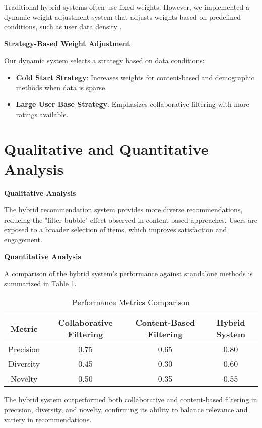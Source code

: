 \documentclass{article}
\begin{document}
Traditional hybrid systems often use fixed weights. However, we implemented a dynamic weight adjustment system that adjusts weights based on predefined conditions, such as user data density \cite{Tian2019}. 

\textbf{Strategy-Based Weight Adjustment}

Our dynamic system selects a strategy based on data conditions:
\begin{itemize}
    \item \textbf{Cold Start Strategy}: Increases weights for content-based and demographic methods when data is sparse.
    \item \textbf{Large User Base Strategy}: Emphasizes collaborative filtering with more ratings available.
\end{itemize}

\section{Qualitative and Quantitative Analysis}

\textbf{Qualitative Analysis}

The hybrid recommendation system provides more diverse recommendations, reducing the "filter bubble" effect observed in content-based approaches. Users are exposed to a broader selection of items, which improves satisfaction and engagement.

\textbf{Quantitative Analysis}

A comparison of the hybrid system's performance against standalone methods is summarized in Table \ref{table:metrics}.

\begin{table}[h]
    \centering
    \begin{tabular}{|c|c|c|c|}
        \hline
        Metric & Collaborative Filtering & Content-Based Filtering & Hybrid System \\
        \hline
        Precision & 0.75 & 0.65 & 0.80 \\
        Diversity & 0.45 & 0.30 & 0.60 \\
        Novelty & 0.50 & 0.35 & 0.55 \\
        \hline
    \end{tabular}
    \caption{Performance Metrics Comparison}
    \label{table:metrics}
\end{table}

The hybrid system outperformed both collaborative and content-based filtering in precision, diversity, and novelty, confirming its ability to balance relevance and variety in recommendations.
\end{document}
